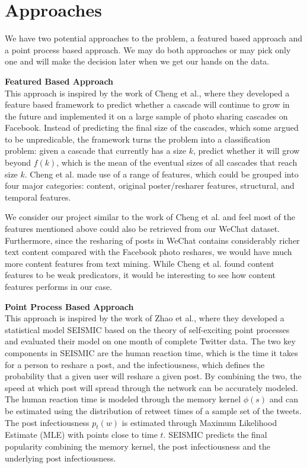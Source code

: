 \documentclass[10pt]{article}
\theoremstyle{plain}
\begin{document}
\section{Approaches}
We have two potential approaches to the problem, a featured based approach and a point process based approach. We may do both approaches or may pick only one and will make the decision later when we get our hands on the data.\par
\textbf{Featured Based Approach} \\
This approach is inspired by the work\cite{Facebook} of Cheng et al., where they developed a feature based framework to predict whether a cascade will continue to grow in the future and implemented it on a large sample of photo sharing cascades on Facebook. Instead of predicting the final size of the cascades, which some argued to be unpredicable, the framework turns the problem into a classification problem: given a cascade that currently has a size $k$, predict whether it will grow beyond $f(k)$, which is the mean of the eventual sizes of all cascades that reach size $k$. Cheng et al. made use of a range of features, which could be grouped into four major categories: content, original poster/resharer features, structural, and temporal features.\par
We consider our project similar to the work of Cheng et al. and feel most of the features mentioned above could also be retrieved from our WeChat dataset. Furthermore, since the resharing of posts in WeChat contains considerably richer text content compared with the Facebook photo reshares, we would have much more content features from text mining. While Cheng et al. found content features to be weak predicators, it would be interesting to see how content features performs in our case. \par
\textbf{Point Process Based Approach} \\
This approach is inspired by the work\cite{twitter} of Zhao et al., where they developed a statistical model SEISMIC based on the theory of self-exciting point processes and evaluated their model on one month of complete Twitter data. The two key components in SEISMIC are the human reaction time, which is the time it takes for a person to reshare a post, and the infectiousness, which defines the probability that a given user will reshare a given post. By combining the two, the speed at which post will spread through the network can be accurately modeled. The human reaction time is modeled through the memory kernel $\phi(s)$ and can be estimated using the distribution of retweet times of a sample set of the tweets. The post infectiousness $p_t(w)$ is estimated through Maximum Likelihood Estimate (MLE) with points close to time $t$. SEISMIC predicts the final popularity combining the memory kernel, the post infectiousness and the underlying post infectiousness.\par
\end{document}
